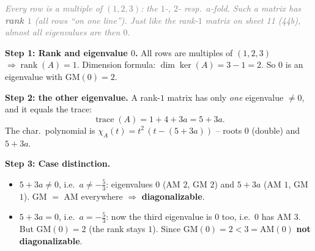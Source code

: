 \documentclass[a4paper,12pt]{article}
\begin{document}
\begin{center}
\end{center}

\textcolor{gray}{\small\textit{Every row is a multiple of $(1,2,3)$: the $1$-, $2$- resp.\ $a$-fold. Such a matrix has \textbf{rank $1$} (all rows ``on one line''). Just like the rank-$1$ matrix on sheet 11 (44b), almost all eigenvalues are then $0$.}}

\textbf{Step 1: Rank and eigenvalue $0$.} All rows are multiples of $(1,2,3)$ $\Rightarrow \operatorname{rank}(A) = 1$. Dimension formula: $\dim\ker(A) = 3 - 1 = 2$. So $0$ is an eigenvalue with $\text{GM}(0) = 2$.

\textbf{Step 2: the other eigenvalue.} A rank-$1$ matrix has only \emph{one} eigenvalue $\neq 0$, and it equals the trace:
\[
\operatorname{trace}(A) = 1 + 4 + 3a = 5 + 3a.
\]
The char.\ polynomial is $\chi_A(t) = t^2\,(t - (5+3a))$ -- roots $0$ (double) and $5+3a$.

\textbf{Step 3: Case distinction.}
\begin{itemize}[leftmargin=*, nosep]
    \item \textbf{$5 + 3a \neq 0$}, i.e.\ $a \neq -\tfrac{5}{3}$: eigenvalues $0$ (AM $2$, GM $2$) and $5+3a$ (AM $1$, GM $1$). GM $=$ AM everywhere $\Rightarrow$ \textbf{diagonalizable}.
    \item \textbf{$5 + 3a = 0$}, i.e.\ $a = -\tfrac{5}{3}$: now the third eigenvalue is $0$ too, i.e.\ $0$ has AM $3$. But GM$(0) = 2$ (the rank stays $1$). Since $\text{GM}(0) = 2 < 3 = \text{AM}(0)$ \textbf{not diagonalizable}.
\end{itemize}
\end{document}
